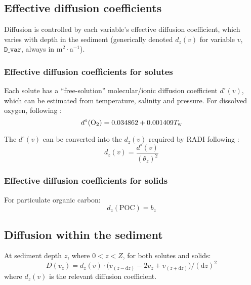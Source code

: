 \documentclass[a4paper]{article}
\newcommand{\D}[1]{\mathrm{d}#1}
\newcommand{\code}[1]{\texttt{#1}}
\begin{document}
\subsection{Effective diffusion coefficients}

Diffusion is controlled by each variable's effective diffusion coefficient, which varies with depth in the sediment (generically denoted $d_z(v)$ for variable $v$, $\code{D\_var}$, always in m$^2\cdot$a$^{-1}$).


\subsubsection{Effective diffusion coefficients for solutes}

Each solute has a ``free-solution'' molecular/ionic diffusion coefficient $d^\circ(v)$, which can be estimated from temperature, salinity and pressure. For dissolved oxygen, following \citet{li_diffusion_1974}:
\begin{equation}
d^\circ(\ce{O2}) = 0.034862 + 0.001409 T_\mathrm{w}
\end{equation}

The $d^\circ(v)$ can be converted into the $d_z(v)$ required by RADI following \citet{boudreau_method--lines_1996}:
\begin{equation}
d_z(v) = \frac{d^\circ(v)}{(\theta_z)^2}
\end{equation}


\subsubsection{Effective diffusion coefficients for solids}

For particulate organic carbon:
\begin{equation}
d_z(\mathrm{POC}) = b_z
\end{equation}


\subsection{Diffusion within the sediment}

At sediment depth $z$, where $0 < z < Z$, for both solutes and solids:
\begin{equation}\label{eq:diffusion}
D(v_z) = d_z(v) \cdot \big( v_{(z-\D{z})} - 2 v_z + v_{(z+\D{z})} \big) / (\D{z})^2
\end{equation}
where $d_z(v)$ is the relevant diffusion coefficient.


\end{document}
